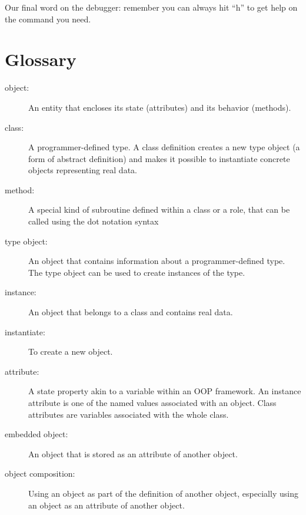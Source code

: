 Our final word on the debugger: remember you can always hit 
``h'' to get help on the command you need. 


\section{Glossary}

\begin{description}

\item[object:] An entity that encloses its state (attributes) 
and its behavior (methods).

\item[class:] A programmer-defined type.  A class definition 
creates a new type object (a form of abstract definition) and 
makes it possible to instantiate concrete objects representing 
real data.

\item[method:] A special kind of subroutine defined within a class or a role, that can be called using the dot notation syntax

\item[type object:] An object that contains information about a
programmer-defined type.  The type object can be used to create instances
of the type.

\item[instance:] An object that belongs to a class and contains 
real data.

\item[instantiate:] To create a new object.

\item[attribute:] A state property akin to a variable within 
an OOP framework. An instance attribute is one of the named 
values associated with an object. Class attributes are variables 
associated with the whole class. 

\item[embedded object:] An object that is stored as an attribute
of another object.

\item[object composition:] Using an object as part of the definition 
of another object, especially using an object as an attribute of 
another object.


\end{description}
